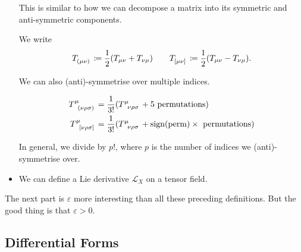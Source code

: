 \begin{itemize}
\begin{leftbar}
      \begin{remark}
        This is similar to how we can decompose a matrix into its symmetric and anti-symmetric components.
      \end{remark}
    \end{leftbar}
    \begin{notation}[]
      We write 
      \begin{equation}
	T \indices{_{(\mu \nu)}} \coloneqq \frac{1}{2} (T_{\mu\nu} + T_{\nu \mu}) \qquad
	T \indices{_{[\mu \nu]}} \coloneqq \frac{1}{2} (T_{\mu\nu} - T_{\nu \mu}).
      \end{equation}
    \end{notation}
    We can also (anti)-symmetrise over multiple indices.
    \begin{example}[]
      \begin{align}
	T \indices{^\mu_{(\nu\rho\sigma)}} &= \frac{1}{3!} (T \indices{^\mu_{\nu\rho\sigma}} + 5 \text{ permutations}) \\
      T \indices{^\mu_{[\nu\rho\sigma]}} &= \frac{1}{3!} (T \indices{^\mu_{\nu\rho\sigma}} + \text{sign(perm)} \times \text{ permutations}) \\
      \end{align}
    \end{example}
    In general, we divide by $p!$, where $p$ is the number of indices we (anti)-symmetrise over.
  \item We can define a Lie derivative $\mathcal{L}_X$ on a tensor field.
\end{itemize}

The next part is $\varepsilon$ more interesting than all these preceding definitions. But the good thing is that $\varepsilon > 0$.

\subsection{Differential Forms}%
\label{sub:differential_forms}


